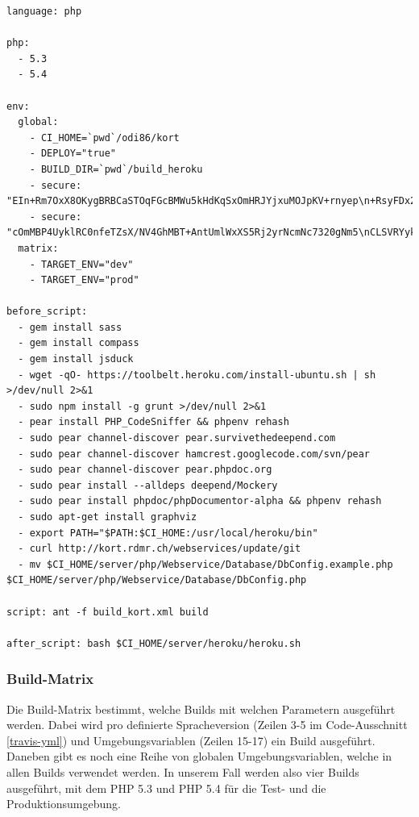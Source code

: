 \lstset{language=XML}
\begin{lstlisting}[float, caption=Die Travis CI Konfigurationsdatei .travis.yml, label=travis-yml]
language: php

php:
  - 5.3
  - 5.4

env:
  global:
    - CI_HOME=`pwd`/odi86/kort
    - DEPLOY="true"
    - BUILD_DIR=`pwd`/build_heroku
    - secure: "EIn+Rm7OxX8OKygBRBCaSTOqFGcBMWu5kHdKqSxOmHRJYjxuMOJpKV+rnyep\n+RsyFDx2Z9yKlqRRS4cpZh7M6wwC63EV46+7aWtzzTjnbMZfVzLQA9EmaEU4\nYMsKGtpQk2mhvaNKd3UbEpDl0Zq74NnAY0zipx0l02UymcFnZEc="
    - secure: "cOmMBP4UyklRC0nfeTZsX/NV4GhMBT+AntUmlWxXS5Rj2yrNcmNc7320gNm5\nCLSVRYyk7/8feyUEMznWrUn/62htZp0tEBAWtXg86dgIZgH4HPy9l2pKuSsH\nxZTHgjUJI7JOuyLG4ID9D5maVLE35UWag/NEtcRVy5QXLZOrs0M="
  matrix:
    - TARGET_ENV="dev"
    - TARGET_ENV="prod"

before_script:
  - gem install sass
  - gem install compass
  - gem install jsduck
  - wget -qO- https://toolbelt.heroku.com/install-ubuntu.sh | sh >/dev/null 2>&1
  - sudo npm install -g grunt >/dev/null 2>&1
  - pear install PHP_CodeSniffer && phpenv rehash
  - sudo pear channel-discover pear.survivethedeepend.com
  - sudo pear channel-discover hamcrest.googlecode.com/svn/pear
  - sudo pear channel-discover pear.phpdoc.org
  - sudo pear install --alldeps deepend/Mockery
  - sudo pear install phpdoc/phpDocumentor-alpha && phpenv rehash
  - sudo apt-get install graphviz
  - export PATH="$PATH:$CI_HOME:/usr/local/heroku/bin"
  - curl http://kort.rdmr.ch/webservices/update/git
  - mv $CI_HOME/server/php/Webservice/Database/DbConfig.example.php $CI_HOME/server/php/Webservice/Database/DbConfig.php

script: ant -f build_kort.xml build

after_script: bash $CI_HOME/server/heroku/heroku.sh
\end{lstlisting}

\subsubsection{Build-Matrix}
Die Build-Matrix bestimmt, welche Builds mit welchen Parametern ausgeführt werden.
Dabei wird pro definierte Spracheversion (Zeilen 3-5 im Code-Ausschnitt \ref{travis-yml}) und Umgebungsvariablen (Zeilen 15-17) ein Build ausgeführt.
Daneben gibt es noch eine Reihe von globalen Umgebungsvariablen, welche in allen Builds verwendet werden.
In unserem Fall werden also vier Builds ausgeführt, mit dem PHP 5.3 und PHP 5.4 für die Test- und die Produktionsumgebung.

